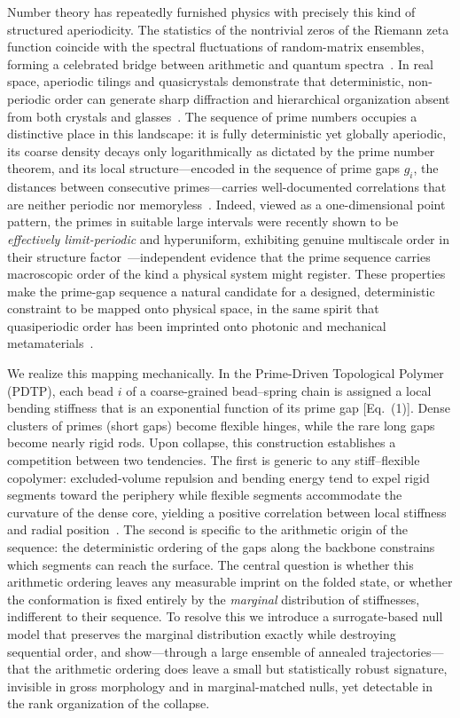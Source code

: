\documentclass[11pt]{article}
\begin{document}
Number theory has repeatedly furnished physics with precisely this kind of
structured aperiodicity. The statistics of the nontrivial zeros of the Riemann
zeta function coincide with the spectral fluctuations of random-matrix ensembles,
forming a celebrated bridge between arithmetic and quantum
spectra~\cite{Montgomery,BerryKeating}. In real space, aperiodic tilings and
quasicrystals demonstrate that deterministic, non-periodic order can generate sharp
diffraction and hierarchical organization absent from both crystals and
glasses~\cite{Shechtman,Levine}. The sequence of prime numbers occupies a
distinctive place in this landscape: it is fully deterministic yet globally
aperiodic, its coarse density decays only logarithmically as dictated by the prime
number theorem, and its local structure---encoded in the sequence of prime gaps
$g_i$, the distances between consecutive primes---carries well-documented
correlations that are neither periodic nor memoryless~\cite{HardyWright,Cramer}.
Indeed, viewed as a one-dimensional point pattern, the primes in suitable large
intervals were recently shown to be \emph{effectively limit-periodic} and
hyperuniform, exhibiting genuine multiscale order in their structure
factor~\cite{Torquato2018,Torquato2019}---independent evidence that the prime
sequence carries macroscopic order of the kind a physical system might register.
These properties make the prime-gap sequence a natural candidate for a designed,
deterministic constraint to be mapped onto physical space, in the same spirit that
quasiperiodic order has been imprinted onto photonic and mechanical
metamaterials~\cite{Macia}.

We realize this mapping mechanically. In the Prime-Driven Topological Polymer
(PDTP), each bead $i$ of a coarse-grained bead--spring chain is assigned a local
bending stiffness that is an exponential function of its prime gap [Eq.~(1)]. Dense
clusters of primes (short gaps) become flexible hinges, while the rare long gaps
become nearly rigid rods. Upon collapse, this construction establishes a
competition between two tendencies. The first is generic to any stiff--flexible
copolymer: excluded-volume repulsion and bending energy tend to expel rigid
segments toward the periphery while flexible segments accommodate the curvature of
the dense core, yielding a positive correlation between local stiffness and radial
position~\cite{KratkyPorod,Montesi}. The second is specific to the arithmetic
origin of the sequence: the deterministic ordering of the gaps along the
backbone constrains which segments can reach the surface. The central question is
whether this arithmetic ordering leaves any measurable imprint on the folded state,
or whether the conformation is fixed entirely by the \emph{marginal} distribution
of stiffnesses, indifferent to their sequence. To resolve this we introduce a
surrogate-based null model that preserves the marginal distribution exactly while
destroying sequential order, and show---through a large ensemble of annealed
trajectories---that the arithmetic ordering does leave a small but statistically
robust signature, invisible in gross morphology and in marginal-matched nulls, yet
detectable in the rank organization of the collapse.
\end{document}
